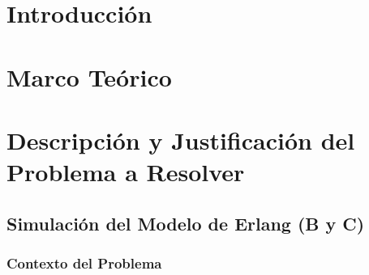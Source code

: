 \documentclass{article}
\begin{document}
\tableofcontents %

\newpage %



\section{Introducción}\label{sec:intr}



\section{Marco Teórico}\label{sec:marc}



\section{Descripción y Justificación del Problema a Resolver}\label{sec:descr}


\subsection{Simulación del Modelo de Erlang (B y C)}\label{subsec:erlang}

\subsubsection{Contexto del Problema}
\end{document}
